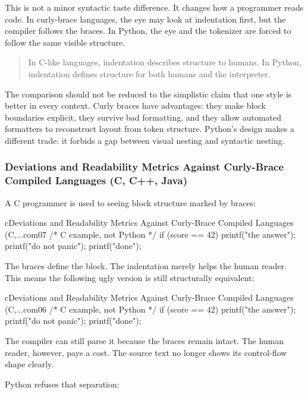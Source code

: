 \documentclass[a4paper,twoside]{report}
\begin{document}
This is not a minor syntactic taste difference. It changes how a programmer reads code. In curly-brace languages, the eye may look at indentation first, but the compiler follows the braces. In Python, the eye and the tokenizer are forced to follow the same visible structure.

\begin{quote}
In C-like languages, indentation describes structure to humans. In Python, indentation defines structure for both humans and the interpreter.
\end{quote}

The comparison should not be reduced to the simplistic claim that one style is better in every context. Curly braces have advantages: they make block boundaries explicit, they survive bad formatting, and they allow automated formatters to reconstruct layout from token structure. Python's design makes a different trade: it forbids a gap between visual nesting and syntactic nesting.

\subsubsection{Deviations and Readability Metrics Against Curly-Brace Compiled Languages (C, C++, Java)}

A C programmer is used to seeing block structure marked by braces:

\begin{codebox}[]{c}{Deviations and Readability Metrics Against Curly-Brace Compiled Languages (C,...}{com07}
/* C example, not Python */
if (score == 42) {
    printf("the answer\n");
    printf("do not panic\n");
}
printf("done\n");
\end{codebox}


The braces define the block. The indentation merely helps the human reader. This means the following ugly version is still structurally equivalent:

\begin{codebox}[]{c}{Deviations and Readability Metrics Against Curly-Brace Compiled Languages (C,...}{com06}
/* C example, not Python */
if (score == 42) {
printf("the answer\n");
printf("do not panic\n");
}
printf("done\n");
\end{codebox}


The compiler can still parse it because the braces remain intact. The human reader, however, pays a cost. The source text no longer shows its control-flow shape clearly.

Python refuses that separation:
\end{document}
